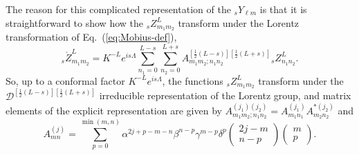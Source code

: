 \documentclass[11pt]{article}
\begin{document}
The reason for this complicated representation of the ${}_sY_{\ell m}$
is that it is straightforward to show how the ${}_sZ^L_{m_1m_2}$
transform under the Lorentz transformation of Eq.~(\ref{eq:Mobius-def}),
\begin{equation}
{}_s\acute{Z}^L_{m_1m_2} = K^{-L}e^{is\Lambda}
    \sum_{n_1=0}^{L-s}{\sum_{n_2=0}^{L+s}{
        A^{[\frac12(L-s)][\frac12(L+s)]}_{m_1m_2;n_1n_2}{}_sZ^L_{n_1n_2}}}.
\end{equation}
So, up to a conformal factor $K^{-L}e^{is\Lambda}$, the functions
${}_sZ^L_{m_1m_2}$ transform under the
$\mathcal{D}^{[\frac12(L-s)][\frac12(L+s)]}$ irreducible
representation of the Lorentz group, and matrix elements of the
explicit representation are given by
$A^{(j_1)(j_2)}_{m_1m_2;n_1n_2}=A^{(j_1)}_{m_1n_1}A^{*(j_2)}_{m_2n_2}$
and
\begin{equation}
  A^{(j)}_{mn}=\sum_{p=0}^{\min(m,n)}{
    \alpha^{2j+p-m-n}\beta^{n-p}\gamma^{m-p}\delta^p
      \left(\begin{array}{c}2j-m \\ n-p\end{array}\right)
      \left(\begin{array}{c}m \\ p\end{array}\right)}.
\end{equation}
\end{document}
